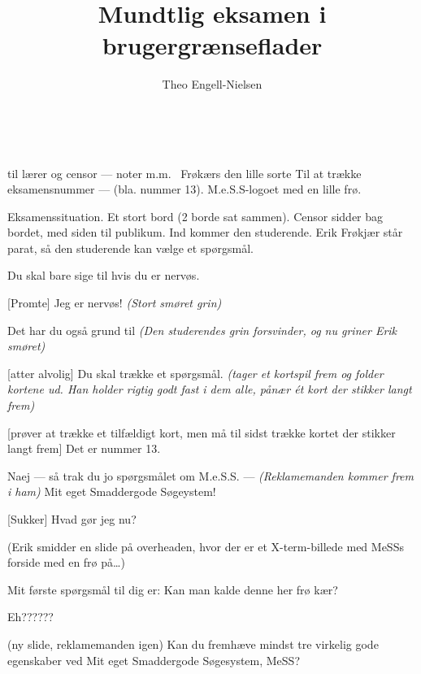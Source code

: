 \documentclass{article}
\title{Mundtlig eksamen i brugergrænseflader}
\author{Theo Engell-Nielsen}
\begin{document}
\maketitle\vspace{-2em}
\begin {roles}
\
\end {roles}\vspace{-1em}
\begin{props}
   til lærer og censor --- noter m.m.\
   Frøkærs den lille sorte 
  \prop{Kort} Til at trække eksamensnummer --- (bla. nummer 13).
  \prop{1 overhead} M.e.S.S-logoet med en lille frø. 
\end{props}\vspace{-2em}
\begin{sketch}

  \scene Eksamenssituation. Et stort bord (2 borde sat sammen). Censor
  sidder bag bordet, med siden til publikum. Ind kommer den studerende.
  Erik Frøkjær står parat, så den studerende kan vælge et spørgsmål.

 Du skal bare sige til hvis du er nervøs.

[Promte] Jeg er nervøs! {\em (Stort smøret grin)}

 Det har du også grund til {\em (Den studerendes grin forsvinder, og nu griner Erik smøret)}

\says{Erik}[atter alvolig] Du skal trække et spørgsmål. {\em (tager et
  kortspil frem og folder kortene ud. Han holder rigtig godt fast i dem
  alle, pånær ét kort der stikker langt frem)}

[prøver at trække et tilfældigt kort, men må til sidst trække
kortet der stikker langt frem] Det er nummer 13.

 Naej --- så trak du jo spørgsmålet om M.e.S.S. --- {\em
(Reklamemanden kommer frem i ham)} Mit eget Smaddergode Søgeystem!

\says{Studerende} [Sukker] Hvad gør jeg nu?

\scene (Erik smidder en slide på overheaden, hvor der er et X-term-billede
med MeSSs forside med en frø på\ldots)

 Mit første spørgsmål til dig er: Kan man kalde denne her frø
kær?

 Eh??????

 (ny slide, reklamemanden igen) Kan du fremhæve mindst tre
virkelig gode egenskaber ved Mit eget Smaddergode Søgesystem, MeSS?


\end{sketch}
\end{document}
